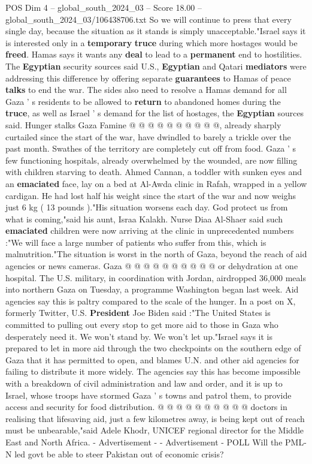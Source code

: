 \begin{textsample}{POS Dim 4 – global\_south\_2024\_03 – Score 18.00 – global\_south\_2024\_03/106438706.txt}
So we will continue to press that every single day, because the situation as it stands is simply unacceptable."Israel says it is interested only in a \textbf{temporary} \textbf{truce} during which more hostages would be \textbf{freed}.
Hamas says it wants any \textbf{deal} to lead to a \textbf{permanent} end to hostilities.
The \textbf{Egyptian} security sources said U.S., \textbf{Egyptian} and Qatari \textbf{mediators} were addressing this difference by offering separate \textbf{guarantees} to Hamas of peace \textbf{talks} to end the war.
The sides also need to resolve a Hamas demand for all Gaza ' s residents to be allowed to \textbf{return} to abandoned homes during the \textbf{truce}, as well as Israel ' s demand for the list of hostages, the \textbf{Egyptian} sources said.
Hunger stalks Gaza Famine @ @ @ @ @ @ @ @ @ @, already sharply curtailed since the start of the war, have dwindled to barely a trickle over the past month.
Swathes of the territory are completely cut off from food.
Gaza ' s few functioning hospitals, already overwhelmed by the wounded, are now filling with children starving to death.
Ahmed Cannan, a toddler with sunken eyes and an \textbf{emaciated} face, lay on a bed at Al-Awda clinic in Rafah, wrapped in a yellow cardigan.
He had lost half his weight since the start of the war and now weighs just 6 kg ( 13 pounds )."His situation worsens each day.
God protect us from what is coming,"said his aunt, Israa Kalakh.
Nurse Diaa Al-Shaer said such \textbf{emaciated} children were now arriving at the clinic in unprecedented numbers :"We will face a large number of patients who suffer from this, which is malnutrition."The situation is worst in the north of Gaza, beyond the reach of aid agencies or news cameras.
Gaza @ @ @ @ @ @ @ @ @ @ or dehydration at one hospital.
The U.S. military, in coordination with Jordan, airdropped 36,000 meals into northern Gaza on Tuesday, a programme Washington began last week.
Aid agencies say this is paltry compared to the scale of the hunger.
In a post on X, formerly Twitter, U.S. \textbf{President} Joe Biden said :"The United States is committed to pulling out every stop to get more aid to those in Gaza who desperately need it.
We won't stand by.
We won't let up."Israel says it is prepared to let in more aid through the two checkpoints on the southern edge of Gaza that it has permitted to open, and blames U.N. and other aid agencies for failing to distribute it more widely.
The agencies say this has become impossible with a breakdown of civil administration and law and order, and it is up to Israel, whose troops have stormed Gaza ' s towns and patrol them, to provide access and security for food distribution. @ @ @ @ @ @ @ @ @ @ doctors in realising that lifesaving aid, just a few kilometres away, is being kept out of reach must be unbearable,"said Adele Khodr, UNICEF regional director for the Middle East and North Africa. - Advertisement - - Advertisement - POLL Will the PML-N led govt be able to steer Pakistan out of economic crisis?

\end{textsample}
